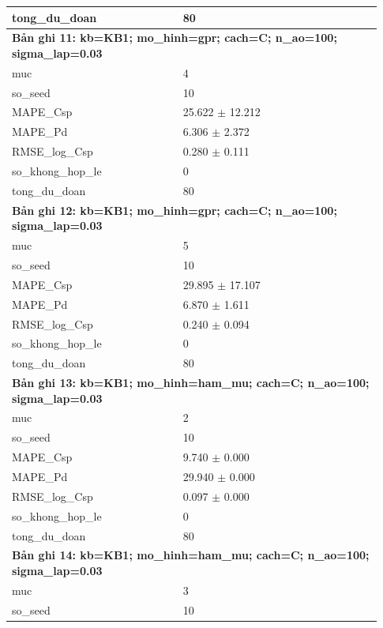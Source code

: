 \begin{longtable}{p{0.43\linewidth}p{0.50\linewidth}}
tong\_\allowbreak du\_\allowbreak doan & 80 \\
\midrule
\multicolumn{2}{p{0.95\linewidth}}{\textbf{Bản ghi 11: kb=KB1; mo\_hinh=gpr; cach=C; n\_ao=100; sigma\_lap=0.03}} \\
muc & 4 \\
so\_\allowbreak seed & 10 \\
MAPE\_\allowbreak Csp & 25.622 $\pm$ 12.212 \\
MAPE\_\allowbreak Pd & 6.306 $\pm$ 2.372 \\
RMSE\_\allowbreak log\_\allowbreak Csp & 0.280 $\pm$ 0.111 \\
so\_\allowbreak khong\_\allowbreak hop\_\allowbreak le & 0 \\
tong\_\allowbreak du\_\allowbreak doan & 80 \\
\midrule
\multicolumn{2}{p{0.95\linewidth}}{\textbf{Bản ghi 12: kb=KB1; mo\_hinh=gpr; cach=C; n\_ao=100; sigma\_lap=0.03}} \\
muc & 5 \\
so\_\allowbreak seed & 10 \\
MAPE\_\allowbreak Csp & 29.895 $\pm$ 17.107 \\
MAPE\_\allowbreak Pd & 6.870 $\pm$ 1.611 \\
RMSE\_\allowbreak log\_\allowbreak Csp & 0.240 $\pm$ 0.094 \\
so\_\allowbreak khong\_\allowbreak hop\_\allowbreak le & 0 \\
tong\_\allowbreak du\_\allowbreak doan & 80 \\
\midrule
\multicolumn{2}{p{0.95\linewidth}}{\textbf{Bản ghi 13: kb=KB1; mo\_hinh=ham\_mu; cach=C; n\_ao=100; sigma\_lap=0.03}} \\
muc & 2 \\
so\_\allowbreak seed & 10 \\
MAPE\_\allowbreak Csp & 9.740 $\pm$ 0.000 \\
MAPE\_\allowbreak Pd & 29.940 $\pm$ 0.000 \\
RMSE\_\allowbreak log\_\allowbreak Csp & 0.097 $\pm$ 0.000 \\
so\_\allowbreak khong\_\allowbreak hop\_\allowbreak le & 0 \\
tong\_\allowbreak du\_\allowbreak doan & 80 \\
\midrule
\multicolumn{2}{p{0.95\linewidth}}{\textbf{Bản ghi 14: kb=KB1; mo\_hinh=ham\_mu; cach=C; n\_ao=100; sigma\_lap=0.03}} \\
muc & 3 \\
so\_\allowbreak seed & 10 \\

\end{longtable}

